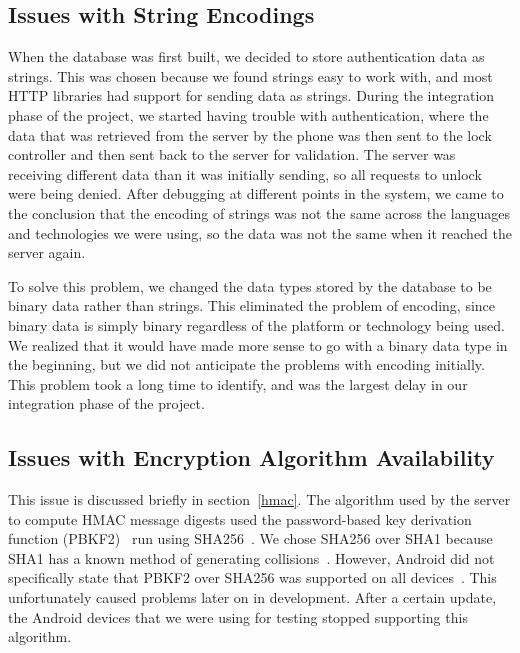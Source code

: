 \documentclass[12pt]{report}
\let\Oldsubsection\subsection
\renewcommand{\subsection}{\FloatBarrier\Oldsubsection}
\begin{document}
\subsection{Issues with String Encodings} \label{issues-with-string-encodings}

When the database was first built, we decided to store authentication data as strings. This
was chosen because we found strings easy to work with, and most HTTP libraries had support
for sending data as strings. During the integration phase of the project, we started having trouble
with authentication, where the data that was retrieved from the server by the phone was then sent
to the lock controller and then sent back to the server for validation. The server was receiving
different data than it was initially sending, so all requests to unlock were being denied. After
debugging at different points in the system, we came to the conclusion that the encoding of
strings was not the same across the languages and technologies we were using, so the data was
not the same when it reached the server again.

To solve this problem, we changed the data types stored by the database to be binary data
rather than strings. This eliminated the problem of encoding, since binary data is simply binary
regardless of the platform or technology being used. We realized that it would have made more
sense to go with a binary data type in the beginning, but we did not anticipate the problems with
encoding initially. This problem took a long time to identify, and was the largest delay in our
integration phase of the project.

\subsection{Issues with Encryption Algorithm Availability} \label{issues-with-encryption-algorithm-availability}

This issue is discussed briefly in section~\ref{hmac}. The algorithm used by the server to compute HMAC message digests
used the password-based key derivation function (PBKF2)~\autocite{RFC6070} run using SHA256~\autocite{RFC4634}. We chose
SHA256 over SHA1 because SHA1 has a known method of generating collisions~\autocite{SHA1COLLISION}. However, Android
did not specifically state that PBKF2 over SHA256 was supported on all devices~\autocite{ANDROIDKEYFACTORY}. This
unfortunately caused problems later on in development. After a certain update, the Android devices that we were using
for testing stopped supporting this algorithm.
\end{document}
